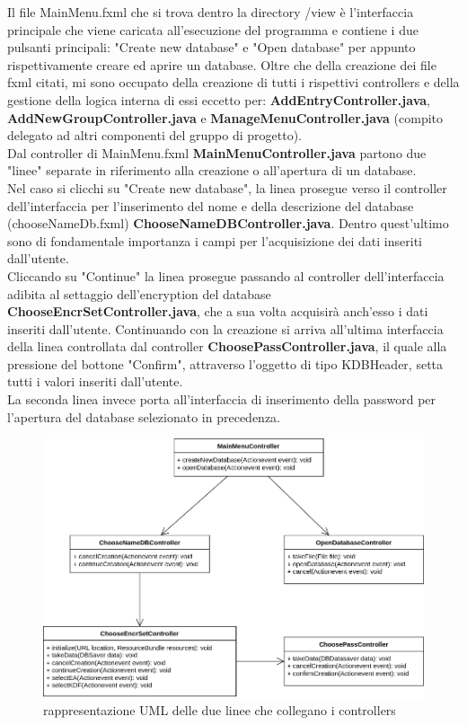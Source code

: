 \documentclass[a4paper,12pt]{report}
\begin{document}
Il file MainMenu.fxml che si trova dentro la directory /view è l'interfaccia principale che viene caricata all'esecuzione del programma e contiene i due pulsanti principali: "Create new database" e "Open database" per appunto rispettivamente creare ed aprire un database. Oltre che della creazione dei file fxml citati, mi sono occupato della creazione di tutti i rispettivi controllers e della gestione della logica interna di essi eccetto per: \textbf{AddEntryController.java}, \textbf{AddNewGroupController.java} e \textbf{ManageMenuController.java} (compito delegato ad altri componenti del gruppo di progetto). \\
Dal controller di MainMenu.fxml \textbf{MainMenuController.java} partono due "linee" separate in riferimento alla creazione o all'apertura di un database. \\
Nel caso si clicchi su "Create new database", la linea prosegue verso il controller dell'interfaccia per l'inserimento del nome e della descrizione del database (chooseNameDb.fxml) \textbf{ChooseNameDBController.java}. Dentro quest'ultimo sono di fondamentale importanza i campi per l'acquisizione dei dati inseriti dall'utente. \\
Cliccando su "Continue" la linea prosegue passando al controller dell'interfaccia adibita al settaggio dell'encryption del database \textbf{ChooseEncrSetController.java}, che a sua volta acquisirà anch'esso i dati inseriti dall'utente.
Continuando con la creazione si arriva all'ultima interfaccia della linea controllata dal controller \textbf{ChoosePassController.java}, il quale alla pressione del bottone "Confirm", attraverso l'oggetto di tipo KDBHeader, setta tutti i valori inseriti dall'utente. \\
La seconda linea invece porta all'interfaccia di inserimento della password per l'apertura del database selezionato in precedenza.\\
\begin{figure}[h]
\centering{}
\includegraphics[width=\textwidth]{controllers.png}
\caption{rappresentazione UML delle due linee che collegano i controllers}
\end{figure}\\
\end{document}
